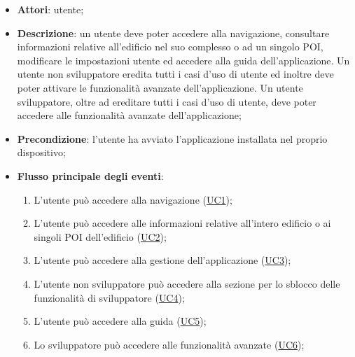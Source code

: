 \documentclass[../AnalisiDeiRequisiti.tex]{subfiles}
\begin{document}
\begin{itemize}
	\item \textbf{Attori}: utente;
	\item \textbf{Descrizione}: un utente deve poter accedere alla navigazione, consultare informazioni relative all'edificio nel suo complesso o ad un singolo POI, modificare le impostazioni utente ed accedere alla guida dell'applicazione. Un utente non sviluppatore eredita tutti i casi d'uso di utente ed inoltre deve poter attivare le funzionalità avanzate dell'applicazione. Un utente sviluppatore, oltre ad ereditare tutti i casi d'uso di utente, deve poter accedere alle funzionalità avanzate dell'applicazione; 
	\item \textbf{Precondizione}: l'utente ha avviato l'applicazione installata nel proprio dispositivo;
	
	\item \textbf{Flusso principale degli eventi}:
	\begin{enumerate}
		\item L'utente può accedere alla navigazione (\hyperlink{UC1}{UC1});
		\item L'utente può accedere alle informazioni relative all'intero edificio o ai singoli POI dell'edificio (\hyperlink{UC2}{UC2});
		\item L'utente può accedere alla gestione dell'applicazione (\hyperlink{UC3}{UC3});
		\item L'utente non sviluppatore può accedere alla sezione per lo sblocco delle funzionalità di sviluppatore (\hyperlink{UC4}{UC4});
		\item L'utente può accedere alla guida (\hyperlink{UC5}{UC5});
		\item Lo sviluppatore può accedere alle funzionalità avanzate (\hyperlink{UC6}{UC6});
		

\end{enumerate}
\end{itemize}
\end{document}
